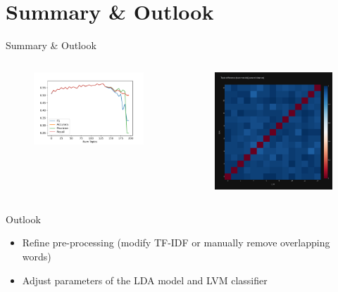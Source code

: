 \documentclass[aspectratio=169,xcolor=dvipsnames]{beamer}
\begin{document}
\section{Summary \& Outlook}

\begin{frame}{Summary \& Outlook}
    \vspace*{-5mm}
    \begin{columns}
        \hspace{-5mm}
        \begin{column}{.7\textwidth}
            \begin{figure}
                \centering
                \includegraphics[width=.55\linewidth]{images/summary_l-svm.pdf}
                \label{fig:summary_lvm}
            \end{figure}
        \end{column}
        \hspace*{-4cm}
        \begin{column}{.7\textwidth}
            \begin{figure}
                \centering
                \includegraphics[width=.33\linewidth]{images/dem_dem_diff_15.png}
                \label{fig:summary_dem_rep_diff_15}
            \end{figure}
        \end{column}
    \end{columns}

    \begin{block}{Outlook}
        \begin{itemize}
            \item Refine pre-processing (modify TF-IDF or manually remove overlapping words)
            \item Adjust parameters of the LDA model and LVM classifier
        \end{itemize}
    \end{block}
    

\end{frame}
\end{document}
